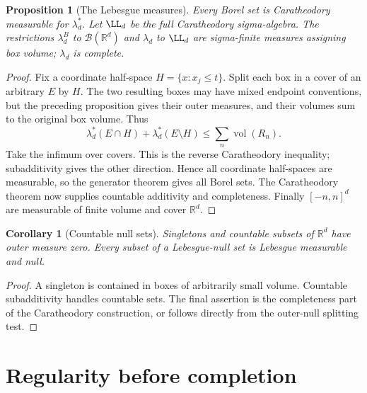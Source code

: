 \documentclass[11pt,oneside,openany]{book}
\newtheorem{proposition}[theorem]{Proposition}
\newtheorem{corollary}[theorem]{Corollary}
\theoremstyle{definition}
\theoremstyle{remark}
\newcommand{\R}{\mathbb R}\newcommand{\C}{\mathbb C}
\newcommand{\BB}{\mathcal B}\newcommand{\SSS}{\mathcal S}
\newcommand{\family}[1]{}
\begin{document}
\begin{proposition}[The Lebesgue measures]
\family{D11.03.lebesgue_measure}\label{d11:03:lebesgue-measure}
Every Borel set is Caratheodory measurable for $\lambda_d^*$. Let $\LL_d$ be
the full Caratheodory sigma-algebra. The restrictions $\lambda_d^B$ to
$\BB(\R^d)$ and $\lambda_d$ to $\LL_d$ are sigma-finite measures assigning
box volume; $\lambda_d$ is complete.
\end{proposition}
\begin{proof}
Fix a coordinate half-space $H=\{x:x_j\leq t\}$. Split each box in a cover
of an arbitrary $E$ by $H$. The two resulting boxes may have mixed endpoint
conventions, but the preceding proposition gives their outer measures, and
their volumes sum to the original box volume. Thus
\[
 \lambda_d^*(E\cap H)+\lambda_d^*(E\setminus H)
 \leq\sum_n\operatorname{vol}(R_n).
\]
Take the infimum over covers. This is the reverse Caratheodory inequality;
subadditivity gives the other direction. Hence all coordinate half-spaces
are measurable, so the generator theorem gives all Borel sets. The
Caratheodory theorem now supplies countable additivity and completeness.
Finally $[-n,n]^d$ are measurable of finite volume and cover $\R^d$.
\end{proof}

\begin{corollary}[Countable null sets]
\family{D11.03.null_countable}\label{d11:03:null-countable}
Singletons and countable subsets of $\R^d$ have outer measure zero. Every
subset of a Lebesgue-null set is Lebesgue measurable and null.
\end{corollary}
\begin{proof}
A singleton is contained in boxes of arbitrarily small volume. Countable
subadditivity handles countable sets. The final assertion is the completeness
part of the Caratheodory construction, or follows directly from the outer-null
splitting test.
\end{proof}

\section{Regularity before completion}
\end{document}
